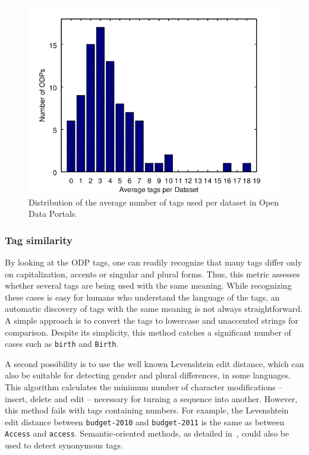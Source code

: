 \begin{figure}[tb]
\begin{center}
\includegraphics[scale=1.2]{images/tags_per_dataset.png}
\caption{Distribution of the average number of tags used per dataset in Open Data Portals.}
\label{fig:tags_per_ds}
\end{center}
\end{figure}

\subsubsection{Tag similarity}
By looking at the ODP tags, one can readily recognize that many tags differ only on capitalization, accents or singular and plural forms.
Thus, this metric assesses whether several tags are being used with the same meaning.
While recognizing these cases is easy for humans who understand the language of the tags, an automatic discovery of tags with the same meaning is not always straightforward.
A simple approach is to convert the tags to lowercase and unaccented strings for comparison. 
Despite its simplicity, this method catches a significant number of cases such as \texttt{birth} and \texttt{Birth}.

A second possibility is to use the well known Levenshtein edit distance, which can also be suitable for detecting gender and plural differences, in some languages. 
This algorithm calculates the minimum number of character modifications -- insert, delete and edit -- necessary for turning a sequence into another. 
However, this method fails with tags containing numbers. 
For example, the Levenshtein edit distance between \texttt{budget-2010} and \texttt{budget-2011} is the same as between \texttt{Access} and \texttt{access}.
Semantic-oriented methods, as detailed in~, could also be used to detect synonymous tags.

